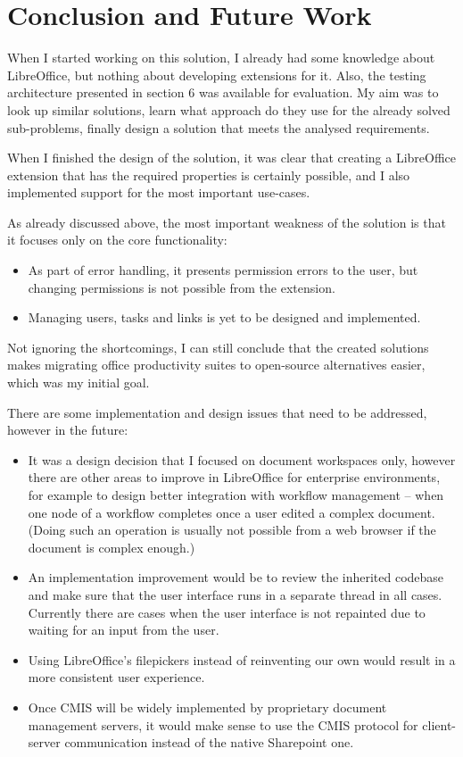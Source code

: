\section{Conclusion and Future Work}

When I started working on this solution, I already had some knowledge about
LibreOffice, but nothing about developing extensions for it. Also, the testing
architecture presented in section 6 was available for evaluation. My aim was to
look up similar solutions, learn what approach do they use for the already
solved sub-problems, finally design a solution that meets the analysed
requirements.

When I finished the design of the solution, it was clear that creating a
LibreOffice extension that has the required properties is certainly possible,
and I also implemented support for the most important use-cases.

As already discussed above, the most important weakness of the solution is that
it focuses only on the core functionality:

\begin{itemize}
\item As part of error handling, it presents permission errors to the user, but
changing permissions is not possible from the extension.
\item Managing users, tasks and links is yet to be designed and implemented.
\end{itemize}

Not ignoring the shortcomings, I can still conclude that the created solutions
makes migrating office productivity suites to open-source alternatives easier,
which was my initial goal.

There are some implementation and design issues that need to be addressed,
however in the future:

\begin{itemize}
\item It was a design decision that I focused on document workspaces only,
however there are other areas to improve in LibreOffice for enterprise
environments, for example to design better integration with workflow management
-- when one node of a workflow completes once a user edited a complex document.
(Doing such an operation is usually not possible from a web browser if the
document is complex enough.)
\item An implementation improvement would be to review the inherited codebase
and make sure that the user interface runs in a separate thread in all cases.
Currently there are cases when the user interface is not repainted due to
waiting for an input from the user.
\item Using LibreOffice's filepickers instead of reinventing our own would
result in a more consistent user experience.
\item Once CMIS will be widely implemented by proprietary document management
servers, it would make sense to use the CMIS protocol for client-server
communication instead of the native Sharepoint one.
\end{itemize}
